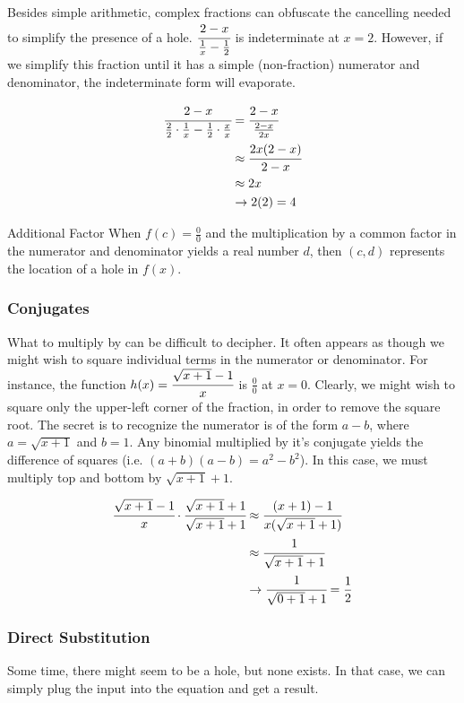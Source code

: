 Besides simple arithmetic, complex fractions can obfuscate the cancelling 
needed to simplify the presence
of a hole.  $\cfrac{2-x}{\frac{1}{x}-\frac{1}{2}}$ is indeterminate at $x=2$.  
However, if we simplify this fraction until it has a simple (non-fraction) numerator and 
denominator, the indeterminate form will evaporate.


\begin{align*}
\cfrac{2-x}{\frac{2}{2}\cdot\frac{1}{x}-\frac{1}{2}\cdot\frac{x}{x}} &= \cfrac{2-x}{\frac{2-x}{2x}} \\
&\approx \cfrac{2x(2-x)}{2-x} \\
&\approx 2x\\
&\rightarrow 2(2) = 4
\end{align*}



\begin{derivation}{Additional Factor}
When $f(c)=\frac{0}{0}$ and the multiplication by a common factor in the numerator and denominator yields a real number $d$,
then $(c,d)$ represents the location of a hole in $f(x)$.
\end{derivation}



\subsubsection{Conjugates}
What to multiply by can be difficult to decipher.  It often appears as though we might wish to square individual terms 
in the numerator or denominator.  For instance, the function $h(x) = \cfrac{\sqrt{x+1}-1}{x}$ is $\frac{0}{0}$ at $x=0$.
Clearly, we might wish to square only the upper-left corner of the fraction, in order to remove the square root.  The
secret is to recognize the numerator is of the form $a-b$, where $a=\sqrt{x+1}$ and $b=1$.  Any binomial multiplied
by it's conjugate yields the difference of squares (i.e. $(a+b)(a-b)=a^2-b^2$).  In this case, we must multiply top and
bottom by $\sqrt{x+1}+1$.


\begin{align*}
\cfrac{\sqrt{x+1}-1}{x} \cdot \cfrac{\sqrt{x+1}+1}{\sqrt{x+1}+1} &\approx \cfrac{(x+1)-1}{x(\sqrt{x+1}+1)}\\
&\approx \cfrac{1}{\sqrt{x+1}+1}\\
&\rightarrow \cfrac{1}{\sqrt{0+1}+1} = \frac{1}{2}
\end{align*}

\subsubsection{Direct Substitution}
Some time, there might seem to be a hole, but none exists.  In that case, we can simply plug
the input into the equation and get a result.


